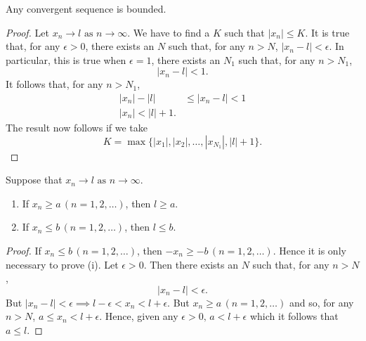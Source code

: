\documentclass[10pt, a4paper]{article}
\newcommand{\limas}[3][n]{#2 \rightarrow #3 \text{ as } #1 \rightarrow \infty}
\begin{document}
\begin{theorem}\label{thm_seq_convisbound}
    Any convergent sequence is bounded.
    \begin{proof}
        Let $\limas{x_n}{l}$. We have to find a $K$ such that $|x_n| \leq K$.
        It is true that, for any $\epsilon > 0$, there exists an $N$ such that, for any $n > N$, $|x_n - l| < \epsilon$. In particular, this is true when $\epsilon = 1$, there exists an $N_1$ such that, for any $n > N_1$,
        $$|x_n - l| < 1.$$
        It follows that, for any $n > N_1$,
        \begin{align*}
            |x_n| - |l| &\leq |x_n - l| < 1 \\
            |x_n| < |l| + 1.
        \end{align*}
        The result now follows if we take
        $$K = \max{\{|x_1|, |x_2|, \dotsc, |x_{N_1}|, |l| + 1\}}.$$
    \end{proof}
\end{theorem}

\begin{theorem}\label{thm_seq_convisbounds}
    Suppose that $\limas{x_n}{l}$.
    \begin{enumerate}[label = (\roman*)]
        \item If $x_n \geq a\,(n = 1, 2, \dotsc)$, then $l \geq a$.
        \item If $x_n \leq b\,(n = 1, 2, \dotsc)$, then $l \leq b$.
    \end{enumerate}
    \begin{proof}
        If $x_n \leq b\,(n = 1, 2, \dotsc)$, then $-x_n \geq -b\,(n = 1, 2, \dotsc)$. Hence it is only necessary to prove (i).
        Let $\epsilon > 0$. Then there exists an $N$ such that, for any $n > N$,
        $$|x_n - l| < \epsilon.$$
        But $|x_n - l| < \epsilon \implies l - \epsilon < x_n < l + \epsilon$. But $x_n \geq a\,(n = 1, 2, \dotsc)$ and so, for any $n > N$, $a \leq x_n < l + \epsilon$. Hence, given any $\epsilon > 0,\, a < l + \epsilon$ which it follows that $a \leq l$.
    \end{proof}
\end{theorem}
\end{document}
